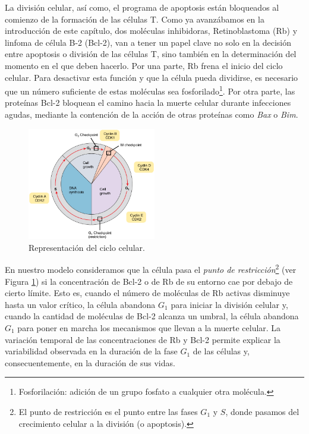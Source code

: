 La división celular, así como, el programa de apoptosis están bloqueados al comienzo de la formación de las células T. Como ya avanzábamos en la introducción de este capítulo, dos moléculas inhibidoras, Retinoblastoma (Rb) y linfoma de célula B-2 (Bcl-2), van a tener un papel clave no solo en la decisión entre apoptosis o división de las células T, sino también en la determinación del momento en el que deben hacerlo. Por una parte, Rb frena el inicio del ciclo celular. Para desactivar esta función y que la célula pueda dividirse, es necesario que un número suficiente de estas moléculas sea fosforilado\footnote{Fosforilación: adición de un grupo fosfato a cualquier otra molécula.}.  Por otra parte, las proteínas Bcl-2 bloquean el camino hacia la muerte celular durante infecciones agudas, mediante la contención de la acción de otras proteínas como \textit{Bax} o \textit{Bim}.


\begin{figure}[t]
	\centering
	\includegraphics[width=0.5\textwidth]{Cell_Cycle}
	\caption{Representación del ciclo celular.}
	\label{fig:ciclo celular}
\end{figure}

En nuestro modelo consideramos que la célula pasa el \textit{punto de restricción}\footnote{El punto de restricción es el punto entre las fases $G_{1}$ y $S$, donde pasamos del crecimiento celular a la división (o apoptosis).} (ver Figura \ref{fig:ciclo celular}) si la concentración de Bcl-2 o de Rb de su entorno cae por debajo de cierto límite. Esto es, cuando el número de moléculas de Rb activas disminuye hasta un valor crítico, la célula abandona $G_1$ para iniciar la división celular y, cuando la cantidad de moléculas de Bcl-2 alcanza un umbral, la célula abandona $G_1$ para poner en marcha los mecanismos que llevan a la muerte celular. La variación temporal de las concentraciones de Rb y Bcl-2 permite explicar la variabilidad observada en la duración de la fase $G_{1}$ de las células y, consecuentemente, en la duración de sus vidas.

